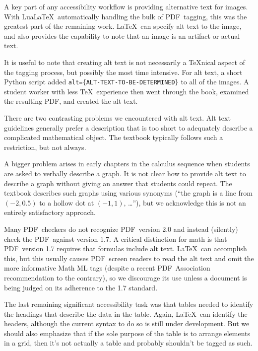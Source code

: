 \documentclass{article}
\makeatletter
\newcommand{\SMC}{%
 \ifdefined\@currsize  %
  \ifx\@currsize\normalsize\small\else
   \ifx\@currsize\small\footnotesize\else
    \ifx\@currsize\footnotesize\scriptsize\else
     \ifx\@currsize\large\normalsize\else
      \ifx\@currsize\Large\large\else
       \ifx\@currsize\LARGE\Large\else
        \ifx\@currsize\scriptsize\tiny\else
         \ifx\@currsize\tiny\tiny\else
          \ifx\@currsize\huge\LARGE\else
           \ifx\@currsize\Huge\huge\else
            \small\SMC@unknown@warning
 \fi\fi\fi\fi\fi\fi\fi\fi\fi\fi\fi
}
\newcommand*{\acro}[1]{{\SMC #1}\@}
\newcommand{\PDF}{\acro{PDF}}
\makeatother
\begin{document}
A key part of any accessibility workflow
is providing alternative text for images.
With Lua\LaTeX\ automatically handling the bulk of \PDF\ tagging,
this was the greatest part of the remaining work.
\LaTeX\ can specify alt text to the image,
and also provides the capability to note that an image
is an artifact or actual text.

It is useful to note that creating alt text is
not necessarily a \TeX nical aspect of the tagging process,
but possibly the most time intensive.
For alt text, a short Python script added
\texttt{alt=\{ALT-TEXT-TO-BE-DETERMINED\}} to all of the images.
A student worker with less \TeX\ experience then went through
the book, examined the resulting \PDF, and created the alt text.

There are two contrasting problems we encountered with alt text.
Alt text guidelines generally prefer a description that is too short
to adequately describe a complicated mathematical object.
The textbook typically follows such a restriction, but not always.

A bigger problem arises in early chapters in the calculus sequence
when students are asked to verbally describe a graph.
It is not clear how to provide alt text to describe a graph
without giving an answer that students could repeat.
The textbook describes such graphs using various synonyms
(``the graph is a line from $(-2,0.5)$ to a hollow dot at $(-1,1)$, \dots''),
but we acknowledge this is not an entirely satisfactory approach.

Many \PDF\ checkers do not recognize \PDF\ version 2.0 and
instead (silently) check the \PDF\ against version 1.7.
A critical distinction for math is that \PDF\ version 1.7 requires that
formulas include alt text.
\LaTeX\ can accomplish this,
but this usually causes \PDF\ screen readers to read the alt text and
omit the more informative Math\acro{ML} tags
(despite a recent \PDF\ Association recommendation to the contrary),
so we discourage its use
unless a document is being judged on its adherence to the 1.7 standard.

The last remaining significant accessibility task was that
tables needed to identify the headings that describe the data in the table.
Again, \LaTeX\ can identify the headers,
although the current syntax to do so is still under development.
But we should also emphasize that if the sole purpose of the table
is to arrange elements in a grid,
then it's not actually a table and probably shouldn't be tagged as such.
\end{document}
